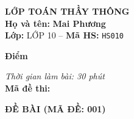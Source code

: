\noindent
\begin{tcolorbox}[colback=white,colframe=black,arc=0mm,boxrule=0.8pt,top=4pt,bottom=4pt,left=6pt,right=6pt]
	\begin{minipage}[c]{0.44\textwidth}
		{\bfseries\large LỚP TOÁN THẦY THÔNG}\\[3pt]
		\textbf{Họ và tên:} \textbf{\large Mai Phương}\\[3pt]
		\textbf{Lớp:} LỚP 10 \quad -- \quad \textbf{Mã HS:} \texttt{HS010}
	\end{minipage}
	\hfill
	\begin{minipage}[c]{0.22\textwidth}
		\begin{tcolorbox}[colback=white,colframe=black,arc=0mm,boxrule=0.6pt,height=1.8cm,halign=center,valign=top,top=2pt]
			{\bfseries\normalsize Điểm}
		\end{tcolorbox}
	\end{minipage}
	\hfill
	\begin{minipage}[c]{0.30\textwidth}
		\raggedleft
		\textit{Thời gian làm bài: 30 phút}\\[4pt]
		\textbf{Mã đề thi:} 
	\end{minipage}
\end{tcolorbox}
\vspace{0.25cm}

\noindent\textbf{\large ĐỀ BÀI (MÃ ĐỀ: 001)}
\vspace{0.1cm}

